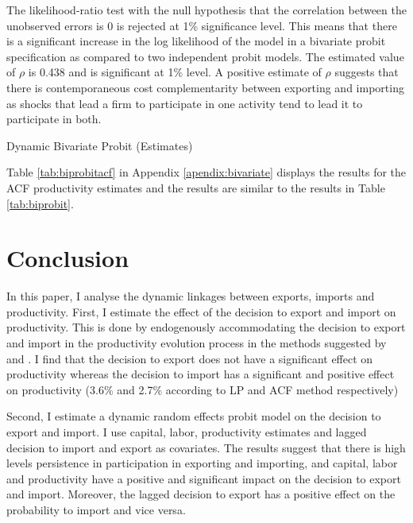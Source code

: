 \documentclass[12pt]{article}
\begin{document}
 The likelihood-ratio test with the null hypothesis that
  the correlation between the unobserved errors is 0 is rejected at
  1\% significance level. This means that there is a significant
  increase in the log likelihood of the model in a bivariate probit
  specification as compared to two independent probit models.
The estimated value of $\rho$ is 0.438 and
  is significant at 1\% level. A positive estimate of $\rho$ suggests that there is
  contemporaneous cost complementarity between exporting and importing 
as shocks that lead a firm to participate in one activity tend
to lead it to participate in both.


\begin{center}
\begin{table}[H]
\caption{Dynamic Bivariate Probit (Estimates)}
\label{tab:biprobit}

\end{table}
\end{center} 

Table \ref{tab:biprobitacf} in Appendix \ref{apendix:bivariate} displays the results for the ACF
productivity estimates and the results are similar to the results in Table \ref{tab:biprobit}. 
 
\section{Conclusion}\label{sec:conclusion}

In this paper, I analyse the dynamic linkages between exports, imports
and productivity. First, I estimate the effect of the decision to export and import
on productivity. This is done by endogenously accommodating the
decision to export and import in the productivity evolution process in
the methods suggested by \textcite{levinsohn2003estimating} and
\textcite{ackerberg2006structural}. I find that the decision to export
does not have a significant effect on productivity whereas the
decision to import has a significant and positive effect  on
productivity (3.6\% and 2.7\% according to LP and ACF method respectively) 

Second, I estimate a dynamic random effects probit model on the
decision to export and import. I use  capital, labor,  productivity
estimates and lagged decision to import and
export as covariates. The results suggest that there is high levels persistence in participation in exporting and importing,
and capital, labor and  productivity have a positive and significant
impact on the decision to export and import. Moreover, the lagged
decision to export has a positive effect on the probability to import
and vice versa. 
\end{document}
